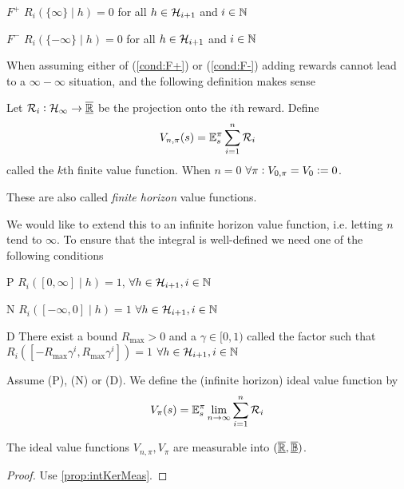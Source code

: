 \begin{cond}{$F^+$}
  $R_i(\{\infty\} \mid h) = 0$ for all
  $h \in \mathcal{H}_{i+1}$ and $i \in \mathbb{N}$
  \label{cond:F+}
\end{cond}
\begin{cond}{$F^-$}
  $R_i(\{-\infty\} \mid h) = 0$ for all
  $h \in \mathcal{H}_{i+1}$ and $i \in \mathbb{N}$
  \label{cond:F-}
\end{cond}
When assuming either of (\cref{cond:F+}) or (\cref{cond:F-})
adding rewards cannot lead to a $\infty - \infty$ situation,
and the following definition makes sense 
\begin{defn}
  Let $\mathcal{R}_i : \mathcal{H}_\infty \to \overline{\underline{\mathbb{R}}}$ be the projection onto the
  $i$th reward. Define
  \[ V_{n,\pi}(s) = \mathbb{E}_s^\pi \sum_{i=1}^n \mathcal{R}_i \]
  called the $k$th finite  value function.
  When $n=0$ $\forall \pi : V_{0,\pi} = V_0 \vcentcolon= 0$.
\end{defn}
These are also called \emph{finite horizon} value functions.

We would like to extend this to an infinite horizon value function,
i.e. letting $n$ tend to $\infty$. To ensure that the integral is well-defined
we need one of the following conditions
\begin{cond}{P} $R_i([0,\infty] \mid h) = 1$,
  $\forall h \in \mathcal{H}_{i+1}, i \in \mathbb{N}$
  \label{cond:P}
\end{cond}
\begin{cond}{N} $R_i([-\infty, 0] \mid h) = 1$
  $\forall h \in \mathcal{H}_{i+1}, i \in \mathbb{N}$
  \label{cond:N} 
\end{cond}
\begin{cond}{D} There exist a bound $R_{\max} > 0$ and a
  $\gamma \in [0,1)$ called the  factor such that
  $R_i([-R_{\max} \gamma^i, R_{\max} \gamma^i]) = 1$
  $\forall h \in \mathcal{H}_{i+1}, i \in \mathbb{N}$
  \label{cond:D}
\end{cond}

\begin{defn}
  Assume (P), (N) or (D). We define the (infinite horizon) ideal value
  function by
  \[ V_\pi(s) = \mathbb{E}_s^\pi \lim_{n \to \infty} \sum_{i=1}^n \mathcal{R}_i \]
\end{defn}

\begin{prop}
  The ideal value functions $V_{n,\pi}, V_\pi$ are measurable
  into $(\underline{\overline{\mathbb{R}}}, \underline{\overline{\mathbb{B}}})$.
\end{prop}
\begin{proof}  
  Use \cref{prop:intKerMeas}.
\end{proof}

